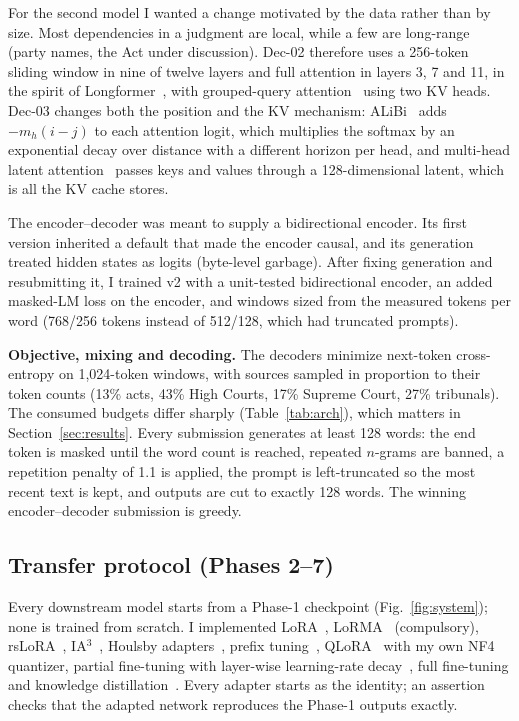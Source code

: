 \documentclass[11pt, oneside]{article}
\begin{document}
For the second model I wanted a change motivated by the data rather than by size. Most dependencies in a judgment are local, while a few are long-range (party names, the Act under discussion). Dec-02 therefore uses a 256-token sliding window in nine of twelve layers and full attention in layers 3, 7 and 11, in the spirit of Longformer~\cite{beltagy2020longformer}, with grouped-query attention~\cite{ainslie2023gqa} using two KV heads. Dec-03 changes both the position and the KV mechanism: ALiBi~\cite{press2022alibi} adds $-m_h(i-j)$ to each attention logit, which multiplies the softmax by an exponential decay over distance with a different horizon per head, and multi-head latent attention~\cite{deepseek2024v2} passes keys and values through a 128-dimensional latent, which is all the KV cache stores.

The encoder--decoder was meant to supply a bidirectional encoder. Its first version inherited a default that made the encoder causal, and its generation treated hidden states as logits (byte-level garbage). After fixing generation and resubmitting it, I trained v2 with a unit-tested bidirectional encoder, an added masked-LM loss on the encoder, and windows sized from the measured tokens per word (768/256 tokens instead of 512/128, which had truncated prompts).

\textbf{Objective, mixing and decoding.} The decoders minimize next-token cross-entropy on 1,024-token windows, with sources sampled in proportion to their token counts (13\% acts, 43\% High Courts, 17\% Supreme Court, 27\% tribunals). The consumed budgets differ sharply (Table~\ref{tab:arch}), which matters in Section~\ref{sec:results}. Every submission generates at least 128 words: the end token is masked until the word count is reached, repeated $n$-grams are banned, a repetition penalty of 1.1 is applied, the prompt is left-truncated so the most recent text is kept, and outputs are cut to exactly 128 words. The winning encoder--decoder submission is greedy.

\subsection{Transfer protocol (Phases 2--7)}
Every downstream model starts from a Phase-1 checkpoint (Fig.~\ref{fig:system}); none is trained from scratch. I implemented LoRA~\cite{hu2022lora}, LoRMA~\cite{bihany2025lorma} (compulsory), rsLoRA~\cite{kalajdzievski2023rslora}, IA$^3$~\cite{liu2022ia3}, Houlsby adapters~\cite{houlsby2019adapters}, prefix tuning~\cite{li2021prefix}, QLoRA~\cite{dettmers2023qlora} with my own NF4 quantizer, partial fine-tuning with layer-wise learning-rate decay~\cite{howard2018ulmfit}, full fine-tuning and knowledge distillation~\cite{hinton2015distilling}. Every adapter starts as the identity; an assertion checks that the adapted network reproduces the Phase-1 outputs exactly.
\end{document}
